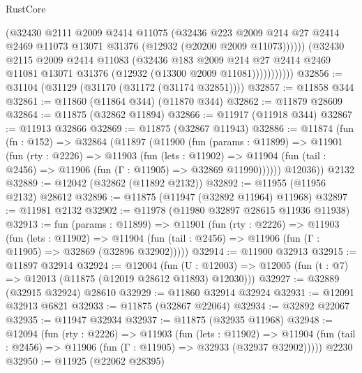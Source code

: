 \begin{lexlean}{RustCore}
\begin{coremodule}
                      (@32430
                        @2111
                        @2009
                        @2414
                        @11075
                        (@32436
                          @223
                          @2009
                          @214
                          @27
                          @2414
                          @2469
                          @11073
                          @13071
                          @31376
                          (@12932 (@20200 @2009 @11073))))))
                  (@32430
                    @2115
                    @2009
                    @2414
                    @11083
                    (@32436
                      @183
                      @2009
                      @214
                      @27
                      @2414
                      @2469
                      @11081
                      @13071
                      @31376
                      (@12932 (@13300 @2009 @11081)))))))))))
@32856 := @31104 (@31129 (@31170 (@31172 (@31174 @32851))))
@32857 := @11858 @344
@32861 := @11860 (@11864 @344) (@11870 @344)
@32862 := @11879 @28609
@32864 := @11875 (@32862 @11894)
@32866 := @11917 (@11918 @344)
@32867 := @11913 @32866
@32869 := @11875 (@32867 @11943)
@32886 := @11874
    (fun (fn : @152) =>
    @32864
      (@11897
        (@11900
          (fun (params : @11899) =>
          @11901
            (fun (rty : @2226) =>
            @11903
              (fun (lets : @11902) =>
              @11904 (fun (tail : @2456) => @11906 (fun (Γ : @11905) => @32869 @11990))))))
        @12036))
    @2132
@32889 := @12042 (@32862 (@11892 @2132))
@32892 := @11955 (@11956 @2132) @28612
@32896 := @11875 (@11947 (@32892 @11964) @11968)
@32897 := @11981 @2132
@32902 := @11978 (@11980 @32897 @28615 @11936 @11938)
@32913 := fun (params : @11899) =>
  @11901
    (fun (rty : @2226) =>
    @11903
      (fun (lets : @11902) =>
      @11904 (fun (tail : @2456) => @11906 (fun (Γ : @11905) => @32869 (@32896 @32902)))))
@32914 := @11900 @32913
@32915 := @11897 @32914
@32924 := @12004
    (fun (U : @12003) => @12005 (fun (t : @7) => @12013 (@11875 (@12019 @28612 @11893) @12030)))
@32927 := @32889 (@32915 @32924) @28610
@32929 := @11860 @32914 @32924
@32931 := @12091 @32913 @6821
@32933 := @11875 (@32867 @22064)
@32934 := @32892 @22067
@32935 := @11947 @32934
@32937 := @11875 (@32935 @11968)
@32948 := @12094
    (fun (rty : @2226) =>
    @11903
      (fun (lets : @11902) =>
      @11904 (fun (tail : @2456) => @11906 (fun (Γ : @11905) => @32933 (@32937 @32902)))))
    @2230
@32950 := @11925 (@22062 @28395)

\end{coremodule}
\end{lexlean}
